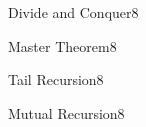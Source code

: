 \documentclass[a4paper]{article}
\begin{document}
\header


\begin{problem}{Divide and Conquer}{8}
\end{problem}

\begin{problem}{Master Theorem}{8}
\end{problem}


\begin{problem}{Tail Recursion}{8}
\end{problem}

\begin{problem}{Mutual Recursion}{8}
\end{problem}
\end{document}
